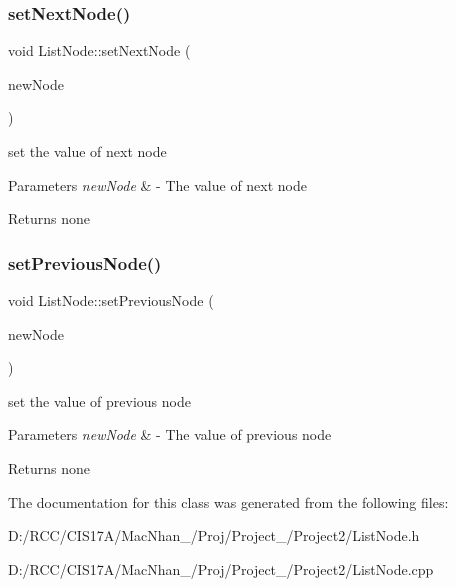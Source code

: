 \subsubsection{\texorpdfstring{set\+Next\+Node()}{setNextNode()}}
{\footnotesize\ttfamily void List\+Node\+::set\+Next\+Node (\begin{DoxyParamCaption}\item[{\hyperlink{class_list_node}{List\+Node} $\ast$}]{new\+Node }\end{DoxyParamCaption})}



set the value of next node 


\begin{DoxyParams}{Parameters}
{\em new\+Node} & -\/ The value of next node \\
\hline
\end{DoxyParams}
\begin{DoxyReturn}{Returns}
none 
\end{DoxyReturn}
\mbox{\label{class_list_node_aa45816b74681f1b3765003477b5f2771}} 
\subsubsection{\texorpdfstring{set\+Previous\+Node()}{setPreviousNode()}}
{\footnotesize\ttfamily void List\+Node\+::set\+Previous\+Node (\begin{DoxyParamCaption}\item[{\hyperlink{class_list_node}{List\+Node} $\ast$}]{new\+Node }\end{DoxyParamCaption})}



set the value of previous node 


\begin{DoxyParams}{Parameters}
{\em new\+Node} & -\/ The value of previous node \\
\hline
\end{DoxyParams}
\begin{DoxyReturn}{Returns}
none 
\end{DoxyReturn}


The documentation for this class was generated from the following files\+:\begin{DoxyCompactItemize}
\item 
D\+:/\+R\+C\+C/\+C\+I\+S17\+A/\+Mac\+Nhan\+\_/\+Proj/\+Project\+\_/\+Project2/List\+Node.\+h\item 
D\+:/\+R\+C\+C/\+C\+I\+S17\+A/\+Mac\+Nhan\+\_/\+Proj/\+Project\+\_/\+Project2/List\+Node.\+cpp\end{DoxyCompactItemize}
